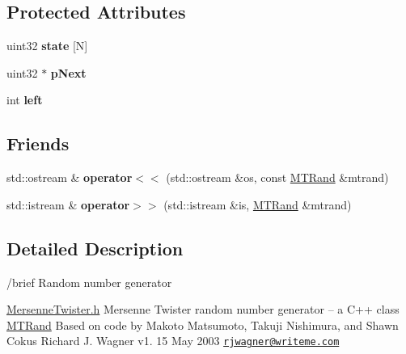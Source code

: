 \subsection*{Protected Attributes}
\begin{DoxyCompactItemize}
\item 
\hypertarget{class_picto_1_1_m_t_rand_ae582066e9d7d3c10de55d0ee98e0cd84}{uint32 {\bfseries state} \mbox{[}N\mbox{]}}\label{class_picto_1_1_m_t_rand_ae582066e9d7d3c10de55d0ee98e0cd84}

\item 
\hypertarget{class_picto_1_1_m_t_rand_a4e366ab548203406ca4cb0cafca1b375}{uint32 $\ast$ {\bfseries p\-Next}}\label{class_picto_1_1_m_t_rand_a4e366ab548203406ca4cb0cafca1b375}

\item 
\hypertarget{class_picto_1_1_m_t_rand_a83b8d2baaff142eb101ab3fc82279979}{int {\bfseries left}}\label{class_picto_1_1_m_t_rand_a83b8d2baaff142eb101ab3fc82279979}

\end{DoxyCompactItemize}
\subsection*{Friends}
\begin{DoxyCompactItemize}
\item 
\hypertarget{class_picto_1_1_m_t_rand_a059061d50a1e54ee3067d4e1dbdd7c64}{std\-::ostream \& {\bfseries operator$<$$<$} (std\-::ostream \&os, const \hyperlink{class_picto_1_1_m_t_rand}{M\-T\-Rand} \&mtrand)}\label{class_picto_1_1_m_t_rand_a059061d50a1e54ee3067d4e1dbdd7c64}

\item 
\hypertarget{class_picto_1_1_m_t_rand_a45b02a702835a3be42171c5c2dc79b2d}{std\-::istream \& {\bfseries operator$>$$>$} (std\-::istream \&is, \hyperlink{class_picto_1_1_m_t_rand}{M\-T\-Rand} \&mtrand)}\label{class_picto_1_1_m_t_rand_a45b02a702835a3be42171c5c2dc79b2d}

\end{DoxyCompactItemize}


\subsection{Detailed Description}
\begin{DoxyVerb}/brief Random number generator
\end{DoxyVerb}


\hyperlink{_mersenne_twister_8h_source}{Mersenne\-Twister.\-h} Mersenne Twister random number generator -- a C++ class \hyperlink{class_picto_1_1_m_t_rand}{M\-T\-Rand} Based on code by Makoto Matsumoto, Takuji Nishimura, and Shawn Cokus Richard J. Wagner v1. 15 May 2003 \href{mailto:rjwagner@writeme.com}{\tt rjwagner@writeme.\-com}

